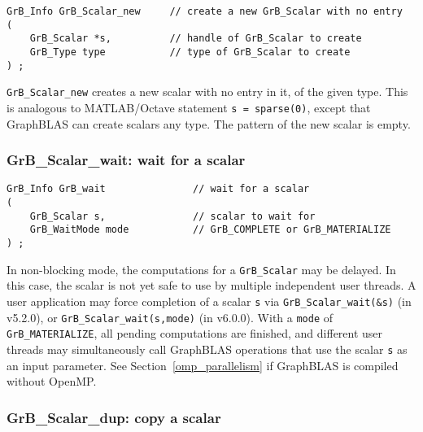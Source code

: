 \documentclass[12pt]{article}
\begin{document}
\begin{mdframed}[userdefinedwidth=6in]
{\footnotesize
\begin{verbatim}
GrB_Info GrB_Scalar_new     // create a new GrB_Scalar with no entry
(
    GrB_Scalar *s,          // handle of GrB_Scalar to create
    GrB_Type type           // type of GrB_Scalar to create
) ;
\end{verbatim}
} \end{mdframed}

\verb'GrB_Scalar_new' creates a new scalar with no
entry in it, of the given type.  This is analogous to MATLAB/Octave statement
\verb's = sparse(0)', except that GraphBLAS can create scalars any
type.  The pattern of the new scalar is empty.

\subsubsection{{\sf GrB\_Scalar\_wait:} wait for a scalar}
\label{scalar_wait}

\begin{mdframed}[userdefinedwidth=6in]
{\footnotesize
\begin{verbatim}
GrB_Info GrB_wait               // wait for a scalar
(
    GrB_Scalar s,               // scalar to wait for
    GrB_WaitMode mode           // GrB_COMPLETE or GrB_MATERIALIZE
) ;
\end{verbatim}
}\end{mdframed}

In non-blocking mode, the computations for a \verb'GrB_Scalar' may be delayed.
In this case, the scalar is not yet safe to use by multiple independent user
threads.  A user application may force completion of a scalar \verb's' via
\verb'GrB_Scalar_wait(&s)' (in v5.2.0), or
\verb'GrB_Scalar_wait(s,mode)' (in v6.0.0).
With a \verb'mode' of \verb'GrB_MATERIALIZE',
all pending computations are finished, and different user threads may
simultaneously call GraphBLAS operations that use the scalar \verb's' as an
input parameter.
See Section~\ref{omp_parallelism}
if GraphBLAS is compiled without OpenMP.

\subsubsection{{\sf GrB\_Scalar\_dup:} copy a scalar}
\label{scalar_dup}
\end{document}
